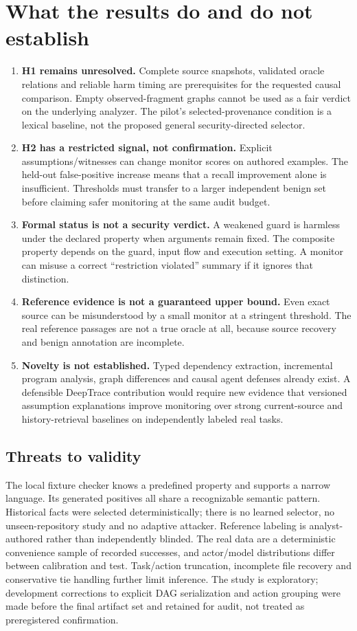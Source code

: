 \documentclass[10pt,letterpaper]{article}
\begin{document}
\section{What the results do and do not establish}
\begin{enumerate}
\item \textbf{H1 remains unresolved.} Complete source snapshots, validated oracle relations and reliable harm timing are prerequisites for the requested causal comparison. Empty observed-fragment graphs cannot be used as a fair verdict on the underlying analyzer. The pilot's selected-provenance condition is a lexical baseline, not the proposed general security-directed selector.
\item \textbf{H2 has a restricted signal, not confirmation.} Explicit assumptions/witnesses can change monitor scores on authored examples. The held-out false-positive increase means that a recall improvement alone is insufficient. Thresholds must transfer to a larger independent benign set before claiming safer monitoring at the same audit budget.
\item \textbf{Formal status is not a security verdict.} A weakened guard is harmless under the declared property when arguments remain fixed. The composite property depends on the guard, input flow and execution setting. A monitor can misuse a correct ``restriction violated'' summary if it ignores that distinction.
\item \textbf{Reference evidence is not a guaranteed upper bound.} Even exact source can be misunderstood by a small monitor at a stringent threshold. The real reference passages are not a true oracle at all, because source recovery and benign annotation are incomplete.
\item \textbf{Novelty is not established.} Typed dependency extraction, incremental program analysis, graph differences and causal agent defenses already exist. A defensible DeepTrace contribution would require new evidence that versioned assumption explanations improve monitoring over strong current-source and history-retrieval baselines on independently labeled real tasks.
\end{enumerate}

\subsection*{Threats to validity}
The local fixture checker knows a predefined property and supports a narrow language. Its generated positives all share a recognizable semantic pattern. Historical facts were selected deterministically; there is no learned selector, no unseen-repository study and no adaptive attacker. Reference labeling is analyst-authored rather than independently blinded. The real data are a deterministic convenience sample of recorded successes, and actor/model distributions differ between calibration and test. Task/action truncation, incomplete file recovery and conservative tie handling further limit inference. The study is exploratory; development corrections to explicit DAG serialization and action grouping were made before the final artifact set and retained for audit, not treated as preregistered confirmation.
\end{document}
